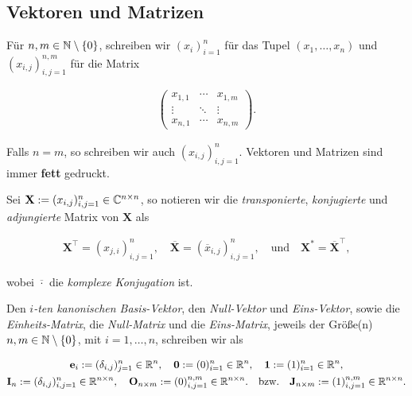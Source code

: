         \subsection{Vektoren und Matrizen}

            Für $n, m \in \mathbb N \setminus {\left \{ 0 \right \}}$, schreiben wir $(x_i)_{i=1}^n$ für das Tupel $(x_1, \dots, x_n)$ und $(x_{i, j})_{i, j = 1}^{n, m}$ für die Matrix

            \begin{align*}
                \begin{pmatrix}
                    x_{1, 1} & \cdots & x_{1, m} \\
                    \vdots   & \ddots & \vdots   \\
                    x_{n, 1} & \cdots & x_{n, m}
                \end{pmatrix}.
            \end{align*}

            Falls $n = m$, so schreiben wir auch $(x_{i, j})_{i, j = 1}^n$.
            Vektoren und Matrizen sind immer \textbf{fett} gedruckt.

            Sei $\mathbf X := (x_{i, j})_{i, j = 1}^n \in \mathbb C^{n \times n}$, so notieren wir die \textit{transponierte}, \textit{konjugierte} und \textit{adjungierte} Matrix von $\mathbf X$ als

            \begin{align*}
                \mathbf X^\top = (x_{j, i})_{i, j = 1}^n,
                \quad
                \overline {\mathbf X} = (\overline x_{i, j})_{i, j = 1}^n,
                \quad
                \text{und}
                \quad
                \mathbf X^\ast = \overline {\mathbf X}^\top,
            \end{align*}

            wobei $\overline \cdot$ die \textit{komplexe Konjugation} ist.

            Den \textit{$i$-ten kanonischen Basis-Vektor}, den \textit{Null-Vektor} und \textit{Eins-Vektor}, sowie die \textit{Einheits-Matrix}, die \textit{Null-Matrix} und die \textit{Eins-Matrix}, jeweils der Größe(n) $n, m \in \mathbb N \setminus {\left \{ 0 \right \}}$, mit $i = 1, \dots, n$, schreiben wir als

            \begin{gather*}
                \mathbf e_i := (\delta_{i,j})_{j=1}^n \in \mathbb R^n,
                \quad
                \mathbf 0 := (0)_{i=1}^n \in \mathbb R^n,
                \quad
                \mathbf 1 := (1)_{i=1}^n \in \mathbb R^n, \\
                \mathbf I_n := (\delta_{i, j})_{i,j=1}^n \in \mathbb R^{n \times n},
                \quad
                \mathbf O_{n \times m} := (0)_{i,j=1}^{n,m} \in \mathbb R^{n \times n}.
                \quad
                \text{bzw.}
                \quad
                \mathbf J_{n \times m} := (1)_{i,j=1}^{n,m} \in \mathbb R^{n \times n}.
            \end{gather*}

